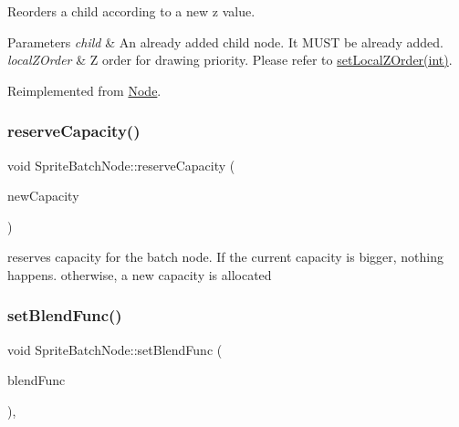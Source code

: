 Reorders a child according to a new z value.


\begin{DoxyParams}{Parameters}
{\em child} & An already added child node. It M\+U\+ST be already added. \\
\hline
{\em local\+Z\+Order} & Z order for drawing priority. Please refer to \hyperlink{classNode_aee4e616c2d55b722226aae1e68b4946f}{set\+Local\+Z\+Order(int)}. \\
\hline
\end{DoxyParams}


Reimplemented from \hyperlink{classNode_a5c9bc72e7f53c1e7f0ef6bc87c07a08f}{Node}.

\mbox{\label{classSpriteBatchNode_a98e5558e331befb2454d11a9395ae6ae}} 
\subsubsection{\texorpdfstring{reserve\+Capacity()}{reserveCapacity()}}
{\footnotesize\ttfamily void Sprite\+Batch\+Node\+::reserve\+Capacity (\begin{DoxyParamCaption}\item[{ssize\+\_\+t}]{new\+Capacity }\end{DoxyParamCaption})}

reserves capacity for the batch node. If the current capacity is bigger, nothing happens. otherwise, a new capacity is allocated \mbox{\label{classSpriteBatchNode_aea7694e73e37e957179a5d82565348e9}} 
\subsubsection{\texorpdfstring{set\+Blend\+Func()}{setBlendFunc()}\hspace{0.1cm}{\footnotesize\ttfamily [1/2]}}
{\footnotesize\ttfamily void Sprite\+Batch\+Node\+::set\+Blend\+Func (\begin{DoxyParamCaption}\item[{const \hyperlink{structBlendFunc}{Blend\+Func} \&}]{blend\+Func }\end{DoxyParamCaption})\hspace{0.3cm}{\ttfamily [override]}, {\ttfamily [virtual]}}



